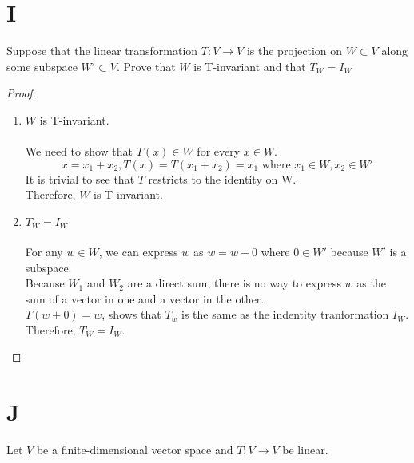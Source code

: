 \documentclass[11pt]{scrartcl}
\begin{document}
\section{I} 
Suppose that the linear transformation $T : V \rightarrow V$ is the projection on $W \subset V$ along some subspace $W' \subset V$.
Prove that $W$ is T-invariant and that $T_W = I_W$
\begin{proof}
	\-\\
\begin{enumerate}[label=\alph*.]
	\item{
		$W$ is T-invariant.\\
		\-\\
		We need to show that $T(x) \in W$ for every $x \in W$.
		$$x = x_1 + x_2, T(x) = T(x_1 + x_2) = x_1 \text{ where } x_1 \in W, x_2 \in W'$$
		It is trivial to see that $T$ restricts to the identity on W.\\
		Therefore, $W$ is T-invariant.
		}
	\item{
		$T_W = I_W$\\
		\-\\
		For any $w \in W$, we can express $w$ as $w = w + 0$ where $0 \in W'$ because $W'$ is a subspace.\\
		Because $W_1$ and $W_2$ are a direct sum, there is no way to express $w$ as the sum of a vector in one and a vector in the other.\\
		$T(w + 0) = w$, shows that $T_w$ is the same as the indentity tranformation $I_W$.\\
		Therefore, $T_W = I_W$.
		}
\end{enumerate}
\end{proof}

\section{J}
Let $V$ be a finite-dimensional vector space and $T: V \rightarrow V$ be linear.
\end{document}
